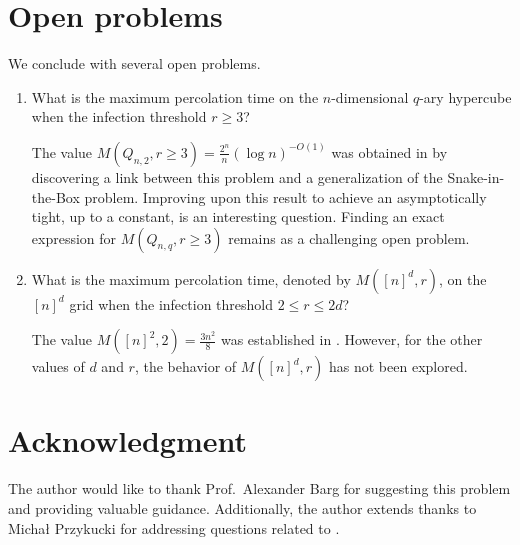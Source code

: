 \documentclass[reqno,11pt]{amsart}
\renewcommand{\leq}{\leqslant}
\renewcommand{\geq}{\geqslant}
\begin{document}
\section{Open problems}
We conclude with several open problems. 
\begin{enumerate}
    \item What is the maximum percolation time on the $n$-dimensional $q$-ary hypercube when the infection threshold $r \geq 3$?
    
\noindent The value $M(Q_{n,2},r \geq 3)=\frac{2^n}{n}(\log n)^{-O(1)}$ was obtained in \cite{Ivailo} by discovering a link between this problem and a generalization of the Snake-in-the-Box problem. Improving upon this result to achieve an asymptotically tight, up to a constant, is an interesting question. Finding an exact expression for $M(Q_{n,q},r \geq 3)$ remains as a challenging open problem. 

\item What is the maximum percolation time, denoted by $M([n]^d,r)$, on the $[n]^d$ grid when the infection threshold $ 2 \leq r \leq 2d$?

\noindent The value $M([n]^2,2)=\frac{3n^2}{8}$ was established in \cite{Benevides}. However, for the other values of $d$ and $r$, the behavior of $M([n]^d,r)$ has not been explored. 
\end{enumerate}



\section*{Acknowledgment}
The author would like to thank Prof.~Alexander Barg for suggesting this problem and providing valuable guidance. Additionally, the author extends thanks to  Micha{\l} Przykucki for addressing questions related to \cite{Michal}. 



\end{document}
